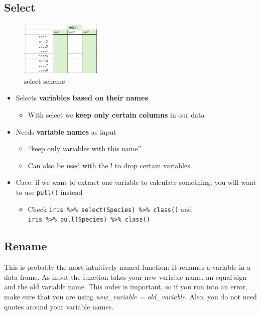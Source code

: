 \documentclass[
]{book}
\providecommand{\tightlist}{%
  \setlength{\itemsep}{0pt}\setlength{\parskip}{0pt}}
\begin{document}
\subsection{Select}\label{select}

\begin{figure}
\centering
\includegraphics[width=\textwidth,height=1.04167in]{./img/select.png}
\caption{select scheme}
\end{figure}

\begin{itemize}
\tightlist
\item
  Selects \textbf{variables based on their names}

  \begin{itemize}
  \tightlist
  \item
    With select we \textbf{keep only certain columns} in our data
  \end{itemize}
\item
  Needs \textbf{variable names} as input

  \begin{itemize}
  \tightlist
  \item
    ``keep only variables with this name''
  \item
    Can also be used with the ! to drop certain variables
  \end{itemize}
\item
  Cave: if we want to extract one variable to calculate something, you will want to use \texttt{pull()} instead

  \begin{itemize}
  \tightlist
  \item
    Check \texttt{iris\ \%\textgreater{}\%\ select(Species)\ \%\textgreater{}\%\ class()} and \texttt{iris\ \%\textgreater{}\%\ pull(Species)\ \%\textgreater{}\%\ class()}
  \end{itemize}
\end{itemize}

\subsection{Rename}\label{rename}

This is probably the most intuitively named function: It renames a variable in a data frame.
As input the function takes your new variable name, an equal sign and the old variable name.
This order is important, so if you run into an error, make sure that you are using \emph{new\_variable = old\_variable}.
Also, you do not need quotes around your variable names.
\end{document}
